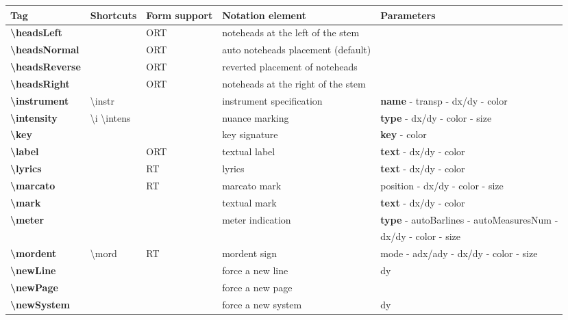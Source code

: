 \documentclass[a4paper, landscape, 10pt]{article}
\begin{document}
\begin{tabularx}{\linewidth}{p{3cm}p{4.5cm}p{3cm}p{5.5cm}l}
    \hline
    \textbf{Tag}&\textbf{Shortcuts}&\textbf{Form support}&\textbf{Notation element}&\textbf{Parameters}\\
    \hline
    \textbf{\textbackslash{}headsLeft}&&ORT&noteheads at the left of the stem&\\
    \hline
    \textbf{\textbackslash{}headsNormal}&&ORT&auto noteheads placement (default)&\\
    \hline
    \textbf{\textbackslash{}headsReverse}&&ORT&reverted placement of noteheads&\\
    \hline
    \textbf{\textbackslash{}headsRight}&&ORT&noteheads at the right of the stem&\\
    \hline
    \textbf{\textbackslash{}instrument}&\textbackslash{}instr&&instrument specification&\textbf{name} - transp - dx/dy - color\\
    \hline
    \textbf{\textbackslash{}intensity}&\textbackslash{}i \textbackslash{}intens&&nuance marking&\textbf{type} - dx/dy - color - size\\
    \hline
    \textbf{\textbackslash{}key}&&&key signature&\textbf{key} - color\\
    \hline
    \textbf{\textbackslash{}label}&&ORT&textual label&\textbf{text} - dx/dy - color\\
    \hline
    \textbf{\textbackslash{}lyrics}&&RT&lyrics&\textbf{text} - dx/dy - color\\
    \hline
    \textbf{\textbackslash{}marcato}&&RT&marcato mark&position - dx/dy - color - size\\
    \hline
    \textbf{\textbackslash{}mark}&&&textual mark&\textbf{text} - dx/dy - color\\
    \hline
    \textbf{\textbackslash{}meter}&&&meter indication&\textbf{type} - autoBarlines - autoMeasuresNum - \\
        &&&&dx/dy - color - size\\
    \hline
    \textbf{\textbackslash{}mordent}&\textbackslash{}mord&RT&mordent sign&mode - adx/ady - dx/dy - color - size\\
    \hline
    \textbf{\textbackslash{}newLine}&&&force a new line&dy\\ %
    \hline
    \textbf{\textbackslash{}newPage}&&&force a new page&\\
    \hline
    \textbf{\textbackslash{}newSystem}&&&force a new system&dy\\ %

\end{tabularx}
\end{document}
